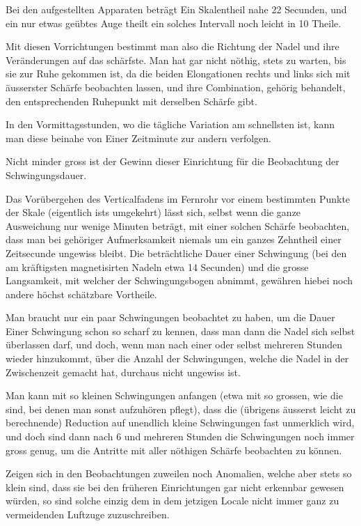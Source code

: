 \documentclass[12pt,a4paper]{article}
\begin{document}
Bei den aufgestellten Apparaten beträgt Ein Skalentheil nahe 22 Secunden, und ein nur etwas geübtes Auge theilt ein solches Intervall noch leicht in 10 Theile.

Mit diesen Vorrichtungen bestimmt man also die Richtung der Nadel und ihre Veränderungen auf das schärfste. Man hat gar nicht nöthig, stets zu warten, bis sie zur Ruhe gekommen ist, da die beiden Elongationen rechts und links sich mit äusserster Schärfe beobachten lassen, und ihre Combination, gehörig behandelt, den entsprechenden Ruhepunkt mit derselben Schärfe gibt.

In den Vormittagsstunden, wo die tägliche Variation am schnellsten ist, kann man diese beinahe von Einer Zeitminute zur andern verfolgen.

Nicht minder gross ist der Gewinn dieser Einrichtung für die Beobachtung der Schwingungsdauer.

Das Vorübergehen des Verticalfadens im Fernrohr vor einem bestimmten Punkte der Skale (eigentlich ists umgekehrt) lässt sich, selbst wenn die ganze Ausweichung nur wenige Minuten beträgt, mit einer solchen Schärfe beobachten, dass man bei gehöriger Aufmerksamkeit niemals um ein ganzes Zehntheil einer Zeitsecunde ungewiss bleibt. Die beträchtliche Dauer einer Schwingung (bei den am kräftigsten magnetisirten Nadeln etwa 14 Secunden) und die grosse Langsamkeit, mit welcher der Schwingungsbogen abnimmt, gewähren hiebei noch andere höchst schätzbare Vortheile.

Man braucht nur ein paar Schwingungen beobachtet zu haben, um die Dauer Einer Schwingung schon so scharf zu kennen, dass man dann die Nadel sich selbst überlassen darf, und doch, wenn man nach einer oder selbst mehreren Stunden wieder hinzukommt, über die Anzahl der Schwingungen, welche die Nadel in der Zwischenzeit gemacht hat, durchaus nicht ungewiss ist.

Man kann mit so kleinen Schwingungen anfangen (etwa mit so grossen, wie die sind, bei denen man sonst aufzuhören pflegt), dass die (übrigens äusserst leicht zu berechnende) Reduction auf unendlich kleine Schwingungen fast unmerklich wird, und doch sind dann nach 6 und mehreren Stunden die Schwingungen noch immer gross genug, um die Antritte mit aller nöthigen Schärfe beobachten zu können.

Zeigen sich in den Beobachtungen zuweilen noch Anomalien, welche aber stets so klein sind, dass sie bei den früheren Einrichtungen gar nicht erkennbar gewesen würden, so sind solche einzig dem in dem jetzigen Locale nicht immer ganz zu vermeidenden Luftzuge zuzuschreiben.
\end{document}

